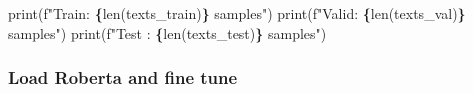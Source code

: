 \documentclass[
]{article}
\newenvironment{Shaded}{\begin{snugshade}}{\end{snugshade}}
\newcommand{\BuiltInTok}[1]{#1}
\newcommand{\NormalTok}[1]{#1}
\newcommand{\SpecialCharTok}[1]{\textcolor[rgb]{0.81,0.36,0.00}{\textbf{#1}}}
\newcommand{\SpecialStringTok}[1]{\textcolor[rgb]{0.31,0.60,0.02}{#1}}
\begin{document}
\begin{Shaded}
\begin{Highlighting}[]
\BuiltInTok{print}\NormalTok{(}\SpecialStringTok{f"Train: }\SpecialCharTok{\{}\BuiltInTok{len}\NormalTok{(texts\_train)}\SpecialCharTok{\}}\SpecialStringTok{ samples"}\NormalTok{)}
\BuiltInTok{print}\NormalTok{(}\SpecialStringTok{f"Valid: }\SpecialCharTok{\{}\BuiltInTok{len}\NormalTok{(texts\_val)}\SpecialCharTok{\}}\SpecialStringTok{ samples"}\NormalTok{)}
\BuiltInTok{print}\NormalTok{(}\SpecialStringTok{f"Test : }\SpecialCharTok{\{}\BuiltInTok{len}\NormalTok{(texts\_test)}\SpecialCharTok{\}}\SpecialStringTok{ samples"}\NormalTok{)}
\end{Highlighting}
\end{Shaded}

\subsubsection{Load Roberta and fine
tune}\label{load-roberta-and-fine-tune}
\end{document}
